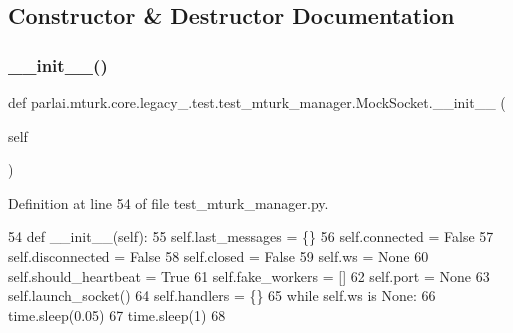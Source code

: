 \subsection{Constructor \& Destructor Documentation}
\mbox{\label{classparlai_1_1mturk_1_1core_1_1legacy__2018_1_1test_1_1test__mturk__manager_1_1MockSocket_a4d6d024810956b86b7a09b2662fe95aa}} 
\subsubsection{\texorpdfstring{\+\_\+\+\_\+init\+\_\+\+\_\+()}{\_\_init\_\_()}}
{\footnotesize\ttfamily def parlai.\+mturk.\+core.\+legacy\+\_.\+test.\+test\+\_\+mturk\+\_\+manager.\+Mock\+Socket.\+\_\+\+\_\+init\+\_\+\+\_\+ (\begin{DoxyParamCaption}\item[{}]{self }\end{DoxyParamCaption})}



Definition at line 54 of file test\+\_\+mturk\+\_\+manager.\+py.


\begin{DoxyCode}
54     \textcolor{keyword}{def }\_\_init\_\_(self):
55         self.last\_messages = \{\}
56         self.connected = \textcolor{keyword}{False}
57         self.disconnected = \textcolor{keyword}{False}
58         self.closed = \textcolor{keyword}{False}
59         self.ws = \textcolor{keywordtype}{None}
60         self.should\_heartbeat = \textcolor{keyword}{True}
61         self.fake\_workers = []
62         self.port = \textcolor{keywordtype}{None}
63         self.launch\_socket()
64         self.handlers = \{\}
65         \textcolor{keywordflow}{while} self.ws \textcolor{keywordflow}{is} \textcolor{keywordtype}{None}:
66             time.sleep(0.05)
67         time.sleep(1)
68 
\end{DoxyCode}


